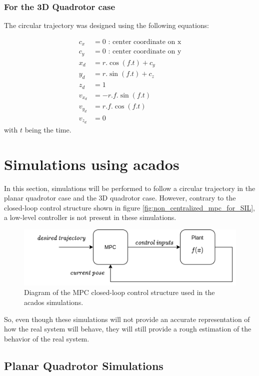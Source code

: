 \documentclass{thesisreport}
\begin{document}
\subsubsection{For the 3D Quadrotor case}
The circular trajectory was designed using the following equations:

\begin{align*}
	c_x &= 0 \text{ : center coordinate on x}\\
	c_y &= 0 \text{ : center coordinate on y}\\
	x_d &= r.\cos(f.t) + c_y \\
	y_d &= r.\sin(f.t) + c_z \\
	z_d &= 1 \\
	v_{x_d} &= -r.f.\sin(f.t) \\ 
	v_{y_d} &=  r.f.\cos(f.t) \\
	v_{z_d} &= 0
\end{align*}
with $t$ being the time.

\newpage

\section{Simulations using acados}
In this section, simulations will be performed to follow a circular trajectory in the planar quadrotor case and the 3D quadrotor case. However, contrary to the closed-loop control structure shown in figure \ref{fig:non_centralized_mpc_for_SIL}, a low-level controller is not present in these simulations.

\begin{figure}[h]
	\centering
	\includegraphics[width=.7\textwidth]{Images/diagrams/old_sim_rev1.png}
	\caption{Diagram of the MPC closed-loop control structure used in the acados simulations.}
	\label{fig:diagram_acados_simulations}
\end{figure}
 
 So, even though these simulations will not provide an accurate representation of how the real system will behave, they will still provide a rough estimation of the behavior of the real system.
 
\subsection{Planar Quadrotor Simulations}
\end{document}
